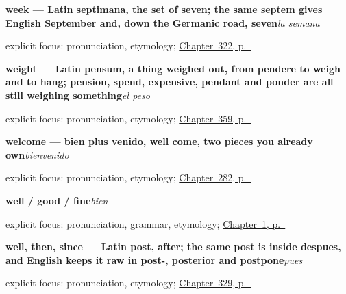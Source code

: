 \noindent\begin{minipage}[t]{\linewidth}
\raggedright
\textbf{week — Latin septimana, the set of seven; the same septem gives English September and, down the Germanic road, seven}\enspace\emph{la semana}\par
\footnotesize explicit focus: pronunciation, etymology; \hyperref[ch:anoche-y-todavia]{Chapter~322, p.~\pageref*{ch:anoche-y-todavia}}
\end{minipage}\par\smallskip

\noindent\begin{minipage}[t]{\linewidth}
\raggedright
\textbf{weight — Latin pensum, a thing weighed out, from pendere to weigh and to hang; pension, spend, expensive, pendant and ponder are all still weighing something}\enspace\emph{el peso}\par
\footnotesize explicit focus: pronunciation, etymology; \hyperref[ch:el-kilo-y-el-litro]{Chapter~359, p.~\pageref*{ch:el-kilo-y-el-litro}}
\end{minipage}\par\smallskip

\noindent\begin{minipage}[t]{\linewidth}
\raggedright
\textbf{welcome — bien plus venido, well come, two pieces you already own}\enspace\emph{bienvenido}\par
\footnotesize explicit focus: pronunciation, etymology; \hyperref[ch:encuentro]{Chapter~282, p.~\pageref*{ch:encuentro}}
\end{minipage}\par\smallskip

\noindent\begin{minipage}[t]{\linewidth}
\raggedright
\textbf{well / good / fine}\enspace\emph{bien}\par
\footnotesize explicit focus: pronunciation, grammar, etymology; \hyperref[ch:first-words]{Chapter~1, p.~\pageref*{ch:first-words}}
\end{minipage}\par\smallskip

\noindent\begin{minipage}[t]{\linewidth}
\raggedright
\textbf{well, then, since — Latin post, after; the same post is inside despues, and English keeps it raw in post-, posterior and postpone}\enspace\emph{pues}\par
\footnotesize explicit focus: pronunciation, etymology; \hyperref[ch:tal-y-salvo]{Chapter~329, p.~\pageref*{ch:tal-y-salvo}}
\end{minipage}\par\smallskip

